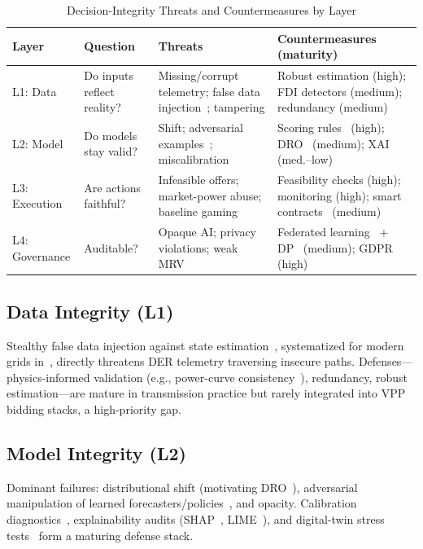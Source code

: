 \documentclass[journal]{IEEEtran}
\begin{document}
\begin{table}[htbp]
\caption{Decision-Integrity Threats and Countermeasures by Layer}
\label{tab:integrity}
\centering
\begin{tabular}{p{1.6cm}p{3.2cm}p{4.2cm}p{5.6cm}}
\toprule
\textbf{Layer} & \textbf{Question} & \textbf{Threats} & \textbf{Countermeasures (maturity)} \\
\midrule
L1: Data & Do inputs reflect reality? & Missing/corrupt telemetry; false data injection~\cite{liu2011fdi,liang2017}; tampering & Robust estimation (high); FDI detectors (medium); redundancy (medium) \\
L2: Model & Do models stay valid? & Shift; adversarial examples~\cite{goodfellow2015}; miscalibration & Scoring rules~\cite{gneiting2007} (high); DRO~\cite{esfahani2018} (medium); XAI~\cite{lundberg2017,ribeiro2016} (med.--low) \\
L3: Execution & Are actions faithful? & Infeasible offers; market-power abuse; baseline gaming & Feasibility checks (high); monitoring (high); smart contracts~\cite{andoni2019} (medium) \\
L4: Governance & Auditable? & Opaque AI; privacy violations; weak MRV & Federated learning~\cite{mcmahan2017} + DP~\cite{dwork2006} (medium); GDPR~\cite{gdpr2016} (high) \\
\bottomrule
\end{tabular}
\end{table}

\subsection{Data Integrity (L1)}
Stealthy false data injection against state estimation~\cite{liu2011fdi}, systematized for modern grids in~\cite{liang2017}, directly threatens DER telemetry traversing insecure paths. Defenses---physics-informed validation (e.g., power-curve consistency~\cite{pinson2013}), redundancy, robust estimation---are mature in transmission practice but rarely integrated into VPP bidding stacks, a high-priority gap.

\subsection{Model Integrity (L2)}
Dominant failures: distributional shift (motivating DRO~\cite{esfahani2018,liudro2022}), adversarial manipulation of learned forecasters/policies~\cite{goodfellow2015}, and opacity. Calibration diagnostics~\cite{gneiting2007}, explainability audits (SHAP~\cite{lundberg2017}, LIME~\cite{ribeiro2016}), and digital-twin stress tests~\cite{tao2019,grieves2014} form a maturing defense stack.
\end{document}
